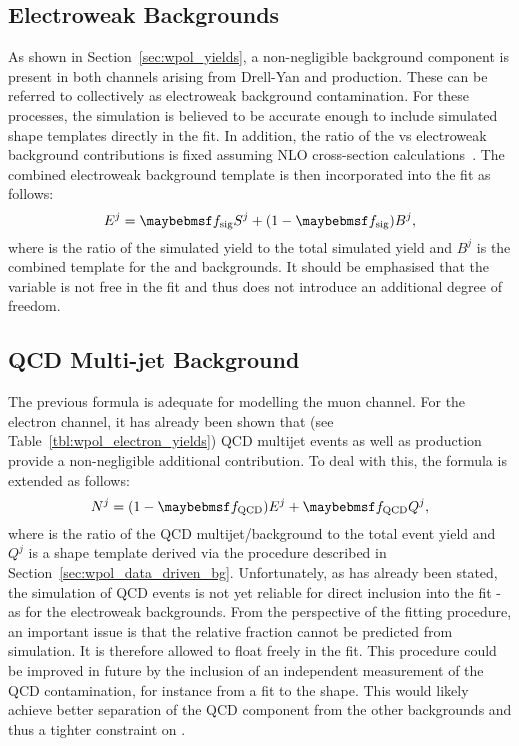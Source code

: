 \subsection{Electroweak Backgrounds}
As shown in Section~\ref{sec:wpol_yields}, a non-negligible background component
is present in both channels arising from Drell-Yan and \ttbar production. These
can be referred to collectively as electroweak background contamination. For
these processes, the simulation is believed to be accurate enough to include
simulated \LP shape templates directly in the fit. In addition, the ratio of the
\Wjets vs electroweak background contributions is fixed assuming \ac{NLO}
cross-section
calculations~\cite{ellis_wp3jet,berger_wp4jet,heavy_quark,top_quark,drellyan}. The
combined electroweak background template is then incorporated into the fit as
follows:
\begin{equation*}
E^j = \fsig S^j + (1-\fsig) B^j,
\end{equation*}
where \fsig is the ratio of the simulated \Wjets yield to the total
simulated yield and $B^j$ is the combined \LP template for the \Zjets and \ttbar
backgrounds. It should be emphasised that the variable \fsig is not
free in the fit and thus does not introduce an additional degree of freedom.

\subsection{\ac{QCD} Multi-jet Background}
The previous formula is adequate for modelling the muon channel. For the
electron channel, it has already been shown that (see
Table~\ref{tbl:wpol_electron_yields}) \ac{QCD} multijet events as well as
\gammajets production provide a non-negligible additional contribution. To deal
with this, the formula is extended as follows:
\begin{equation*}
N^j = (1 - \fQCD) E^j + \fQCD Q^j,
\end{equation*}
where \fQCD is the ratio of the QCD multijet/\gammajets background
to the total event yield and $Q^j$ is a shape template derived via the procedure
described in Section~\ref{sec:wpol_data_driven_bg}. Unfortunately, as has
already been stated, the simulation of QCD events is not yet reliable for direct
inclusion into the fit - as for the electroweak backgrounds. From the
perspective of the fitting procedure, an important issue is that the relative
fraction \fQCD cannot be predicted from simulation. It is therefore
allowed to float freely in the fit. This procedure could be improved in future
by the inclusion of an independent measurement of the \ac{QCD} contamination,
for instance from a fit to the \MET shape. This would likely achieve better
separation of the \ac{QCD} component from the other backgrounds and thus a
tighter constraint on \fQCD.

